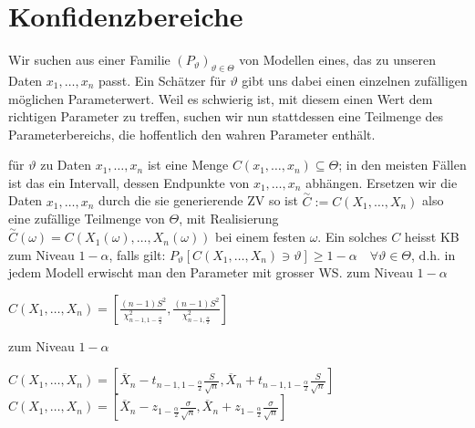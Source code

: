 
\section{Konfidenzbereiche}
Wir suchen aus einer Familie $(P_\vartheta)_{\vartheta \in \Theta}$ von Modellen eines, das zu unseren Daten $x_1, \dots, x_n$ passt. Ein Schätzer für $\vartheta$ gibt uns dabei einen einzelnen zufälligen möglichen Parameterwert. Weil es schwierig ist, mit diesem einen Wert dem richtigen Parameter zu treffen, suchen wir nun stattdessen eine Teilmenge des Parameterbereichs, die hoffentlich den wahren Parameter enthält.
\begin{itemize}
     für $\vartheta$ zu Daten $x_1, \dots, x_n$ ist eine Menge $C(x_1, \dots, x_n) \subseteq \Theta$; in den meisten Fällen ist das ein Intervall, dessen Endpunkte von $x_1, \dots, x_n$ abhängen. Ersetzen wir die Daten $x_1, \dots, x_n$ durch die sie generierende ZV so ist $\overset{\sim}{C} := C(X_1, \dots, X_n)$ also eine zufällige Teilmenge von $\Theta$, mit Realisierung $\overset{\sim}{C}(\omega) = C(X_1(\omega), \dots, X_n(\omega))$ bei einem festen $\omega$. Ein solches $C$ heisst KB zum Niveau $1 - \alpha$, falls gilt: $P_\vartheta[C(X_1, \dots, X_n) \ni \vartheta] \ge 1 - \alpha \quad \forall \vartheta \in \Theta$, d.h. in jedem Modell erwischt man den Parameter mit grosser WS.
     zum Niveau $1 - \alpha$
        \begin{itemize}
             $C(X_1, \dots, X_n) = \left[\frac{(n - 1)S^2}{\chi_{n - 1, 1 - \frac{\alpha}{2}}^2}, \frac{(n - 1)S^2}{\chi_{n - 1, \frac{\alpha}{2}}^2} \right]$
             
        \end{itemize}
     zum Niveau $1 - \alpha$
        \begin{itemize}
             $C(X_1, \dots, X_n) = \left[ \overline X_n - t_{n - 1, 1 - \frac{\alpha}{2}} \frac{S}{\sqrt{n}}, \overline X_n + t_{n - 1, 1 - \frac{\alpha}{2}} \frac{S}{\sqrt{n}} \right]$
             $C(X_1, \dots, X_n) = \left[ \overline X_n - z_{1 - \frac{\alpha}{2}} \frac{\sigma}{\sqrt{n}}, \overline X_n + z_{1 - \frac{\alpha}{2}} \frac{\sigma}{\sqrt{n}} \right]$
        \end{itemize}
\end{itemize}

